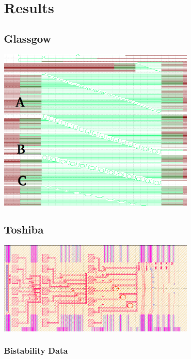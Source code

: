 \newpage
\section{Results}
%   
\subsection{Glassgow}
\begingroup
    \centering  
    \includegraphics[width=10cm]{img/results/glassgowChipNumbering.png}
     \vspace{3pt} \label{crossCompare}
\endgroup
\subsection{Toshiba}
\begingroup
    \centering  
    \includegraphics[width=10cm]{img/results/toshiba.png}
     \vspace{3pt} \label{crossCompare}
\endgroup
\subsubsection{Bistability Data}

